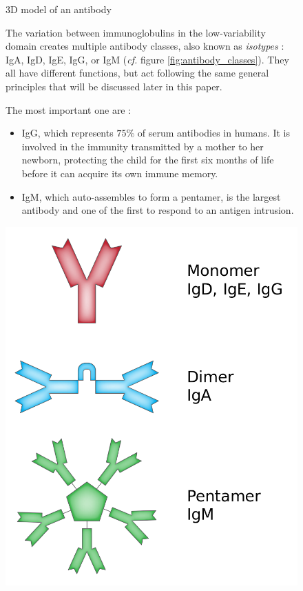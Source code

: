 \begin{figure}[H]
\begin{minipage}{0.495\textwidth}
        \caption{3D model of an antibody}
        \label{fig:immunoglobulin_3D_model}
    \end{minipage}
\end{figure}


\begin{figure}[H]
    \begin{minipage}{0.6\textwidth}
        The variation between immunoglobulins in the low-variability domain
        creates multiple antibody classes, also known as \emph{isotypes} :
        IgA, IgD, IgE, IgG, or IgM (\textit{cf.} figure \ref{fig:antibody_classes}). 
        They all have different functions, but act
        following the same general principles that will be discussed later in this paper.

        The most important one are :
        \begin{itemize}[leftmargin=*]
            \item IgG, which represents $75\%$ of serum antibodies
            in humans. It is involved in the immunity transmitted by a mother
            to her newborn, protecting the child for the first six months of life
            before it can acquire its own immune memory.
            \item IgM, which auto-assembles to form a pentamer, is the largest
            antibody and one of the first to respond to an antigen intrusion.
        \end{itemize}
    \end{minipage}\hfill
    \begin{minipage}{0.35\textwidth}
        \centering
        \includegraphics[width=\textwidth]{../Images/antibody_classes.png}   

\end{minipage}
\end{figure}

